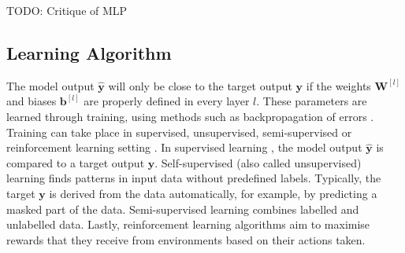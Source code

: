 TODO: Critique of MLP










\subsection{Learning Algorithm}
The model output $\boldsymbol{\hat{y}}$ will only be close to the target output $\boldsymbol{y}$ if the weights $\boldsymbol{W}^{[l]}$ and biases $\boldsymbol{b}^{[l]}$ are properly defined in every layer $l$.
These parameters are learned through training, using methods such as backpropagation of errors .
Training can take place in supervised, unsupervised, semi-supervised or reinforcement learning setting \cite{russell_artificial_2021}. In supervised learning \cite{cord_supervised_2008}, the model output $\boldsymbol{\hat{y}}$ is compared to a target output $\boldsymbol{\hat{y}}$. Self-supervised (also called unsupervised) learning \cite{liu_self-supervised_2021} finds patterns in input data without predefined labels. Typically, the target $\boldsymbol{y}$ is derived from the data automatically, for example, by predicting a masked part of the data. Semi-supervised learning \cite{van_engelen_survey_2020} combines labelled and unlabelled data. Lastly, reinforcement learning algorithms \cite{arulkumaran_deep_2017} aim to maximise rewards that they receive from environments based on their actions taken.

